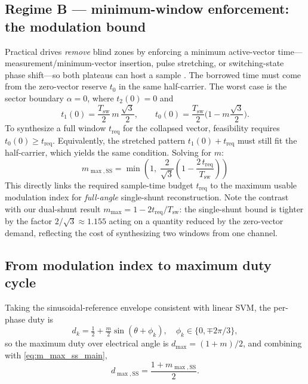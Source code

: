 \documentclass[conference]{IEEEtran}
\newcommand{\Tsw}{T_{\mathrm{sw}}}
\newcommand{\treq}{t_{\mathrm{req}}}
\newcommand{\midx}{m}
\newcommand{\dc}{d}
\begin{document}
\subsection{Regime B --- minimum-window enforcement: the modulation bound}
Practical drives \emph{remove} blind zones by enforcing a minimum active-vector time---measurement/minimum-vector insertion, pulse stretching, or switching-state phase shift---so both plateaus can host a sample \cite{Blaabjerg1997,Gu2011,Yan2016}. The borrowed time must come from the zero-vector reserve $t_0$ in the same half-carrier. The worst case is the sector boundary $\alpha=0$, where $t_2(0)=0$ and
\begin{equation}
t_1(0)=\frac{\Tsw}{2}\,\midx\,\frac{\sqrt{3}}{2}, \qquad
t_0(0)=\frac{\Tsw}{2}\Big(1-\midx\frac{\sqrt{3}}{2}\Big).
\label{eq:t0_boundary}
\end{equation}
To synthesize a full window $\treq$ for the collapsed vector, feasibility requires $t_0(0)\ge \treq$. Equivalently, the stretched pattern $t_1(0)+\treq$ must still fit the half-carrier, which yields the same condition. Solving for $\midx$:
\begin{equation}
\boxed{\
\midx_{\max,\mathrm{SS}}
=
\min\!\left(
1,\;
\frac{2}{\sqrt{3}}\left(1-\frac{2\,\treq}{\Tsw}\right)
\right)\ }
\label{eq:m_max_ss_main}
\end{equation}
This directly links the required sample-time budget $\treq$ to the maximum usable modulation index for \emph{full-angle} single-shunt reconstruction. Note the contrast with our dual-shunt result $\midx_{\max}=1-2\treq/\Tsw$: the single-shunt bound is tighter by the factor $2/\sqrt{3}\approx1.155$ acting on a quantity reduced by the zero-vector demand, reflecting the cost of synthesizing two windows from one channel.

\subsection{From modulation index to maximum duty cycle}
Taking the sinusoidal-reference envelope consistent with linear SVM, the per-phase duty is
\begin{equation}
\dc_k = \tfrac{1}{2} + \tfrac{\midx}{2}\sin(\theta+\phi_k),\quad \phi_k\in\{0,\mp 2\pi/3\},
\end{equation}
so the maximum duty over electrical angle is $\dc_{\max} = (1+\midx)/2$, and combining with \eqref{eq:m_max_ss_main},
\begin{equation}
\boxed{\
\dc_{\max,\mathrm{SS}} = \frac{1+\midx_{\max,\mathrm{SS}}}{2}.\ }
\label{eq:dmax_ss}
\end{equation}
\end{document}
